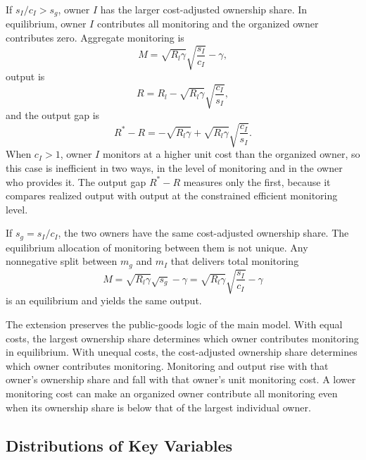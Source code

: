 \documentclass[12pt]{article}
\begin{document}
If $s_I/c_I>s_g$, owner $I$ has the larger cost-adjusted ownership share. In equilibrium, owner $I$ contributes all monitoring and the organized owner contributes zero. Aggregate monitoring is
\begin{equation} \label{(16)}
   M=\sqrt{R_l\gamma}\sqrt{\frac{s_I}{c_I}} -\gamma,
\end{equation}
\noindent
output is
\begin{equation} \label{(17)}
   R=R_l -\sqrt{R_l\gamma}\sqrt{\frac{c_I}{s_I}},
\end{equation}
\noindent
and the output gap is
\begin{equation} \label{(18)}
   R^*-R = -\sqrt{R_l\gamma}+\sqrt{R_l\gamma}\sqrt{\frac{c_I}{s_I}}.
\end{equation}
\noindent When $c_I>1$, owner $I$ monitors at a higher unit cost than the organized owner, so this case is inefficient in two ways, in the level of monitoring and in the owner who provides it. The output gap $R^*-R$ measures only the first, because it compares realized output with output at the constrained efficient monitoring level.

If $s_g=s_I/c_I$, the two owners have the same cost-adjusted ownership share. The equilibrium allocation of monitoring between them is not unique. Any nonnegative split between $m_g$ and $m_I$ that delivers total monitoring
\begin{equation} \label{(19)}
   M=\sqrt{R_l\gamma}\sqrt{s_g}-\gamma = \sqrt{R_l\gamma}\sqrt{\frac{s_I}{c_I}} -\gamma
\end{equation}
\noindent
is an equilibrium and yields the same output.

The extension preserves the public-goods logic of the main model. With equal costs, the largest ownership share determines which owner contributes monitoring in equilibrium. With unequal costs, the cost-adjusted ownership share determines which owner contributes monitoring. Monitoring and output rise with that owner's ownership share and fall with that owner's unit monitoring cost. A lower monitoring cost can make an organized owner contribute all monitoring even when its ownership share is below that of the largest individual owner.

\subsection*{Distributions of Key Variables}
\end{document}
